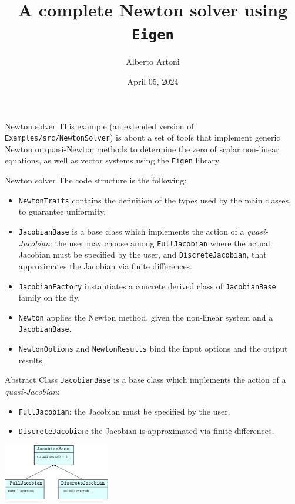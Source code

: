 \documentclass[aspectratio=169,10pt]{beamer}
\begin{document}
    \title{A complete Newton solver using \texttt{Eigen}}
    \author
      {
      Alberto Artoni
      }
    \date{April 05, 2024}

\begin{frame}
    \maketitle
    
\end{frame}


\begin{frame}{Newton solver}
This example (an extended version of \texttt{Examples/src/NewtonSolver}) is about a set of tools that implement generic Newton or quasi-Newton methods to determine the zero of scalar non-linear equations, as well as vector systems using the \texttt{Eigen} library.

\end{frame}

\begin{frame}{Newton solver}
The code structure is the following:
\begin{itemize}
\item \texttt{NewtonTraits} contains the definition of the types used by the main classes, to guarantee uniformity.
\item \texttt{JacobianBase} is a base class which implements the action of a \textit{quasi-Jacobian}: the user may choose among \texttt{FullJacobian} where the actual Jacobian must be specified by the user, and \texttt{DiscreteJacobian}, that approximates the Jacobian via finite differences.
\item \texttt{JacobianFactory} instantiates a concrete derived class of \texttt{JacobianBase} family on the fly.
\item \texttt{Newton} applies the Newton method, given the non-linear system and a \texttt{JacobianBase}.
\item \texttt{NewtonOptions} and \texttt{NewtonResults} bind the input options and the output results.
\end{itemize}
\end{frame}

\begin{frame}{Abstract Class}
	\texttt{JacobianBase} is a base class which implements the action of a \textit{quasi-Jacobian}:
\begin{itemize}
	\item \texttt{FullJacobian}: the Jacobian must be specified by the user.
	\item \texttt{DiscreteJacobian}: the Jacobian is approximated via finite differences.	
\end{itemize}
	
	\begin{center}
	\includegraphics[width=0.35\textwidth]{ipe/class.pdf}
	\end{center}
\end{frame}
\end{document}
